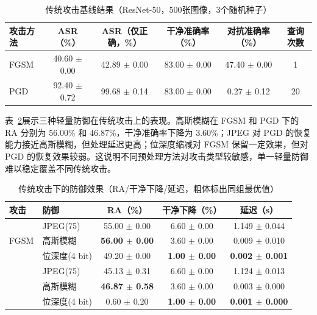 \documentclass[type=bachelor,oneside]{fduthesis}
\newcommand{\best}[1]{\textbf{#1}}
\newcommand{\tablefont}{\small}
\begin{document}
\begin{table}[htbp]
  \centering
  \caption{传统攻击基线结果（ResNet-50，500张图像，3个随机种子）}
  \label{tab:trad_attack_new}
  \tablefont
  \setlength{\tabcolsep}{3pt}
  \begin{tabular}{lccccc}
    \toprule
    攻击方法 & ASR（\%） & ASR（仅正确，\%） & 干净准确率（\%） & 对抗准确率（\%） & 查询次数 \\
    \midrule
    FGSM & 40.60 $\pm$ 0.00 & 42.89 $\pm$ 0.00 & 83.00 $\pm$ 0.00 & 47.40 $\pm$ 0.00 & 1 \\
    PGD & 92.40 $\pm$ 0.72 & 99.68 $\pm$ 0.14 & 83.00 $\pm$ 0.00 & 0.27 $\pm$ 0.12 & 20 \\
    \bottomrule
  \end{tabular}
\end{table}

表~\ref{tab:trad_defense_new}展示三种轻量防御在传统攻击上的表现。高斯模糊在 FGSM 和 PGD 下的 RA 分别为 56.00\% 和 46.87\%，干净准确率下降为 3.60\%；JPEG 对 PGD 的恢复能力接近高斯模糊，但处理延迟更高；位深度缩减对 FGSM 保留一定效果，但对 PGD 的恢复效果较弱。这说明不同预处理方法对攻击类型较敏感，单一轻量防御难以稳定覆盖不同传统攻击。

\begin{table}[htbp]
  \centering
  \caption{传统攻击下的防御效果（RA/干净下降/延迟，粗体标出同组最优值）}
  \label{tab:trad_defense_new}
  \tablefont
  \setlength{\tabcolsep}{4pt}
  \renewcommand{\arraystretch}{1.12}
  \begin{tabular}{@{}llccc@{}}
    \toprule
    攻击 & 防御 & RA（\%） & 干净下降（\%） & 延迟（s） \\
    \midrule
    \multirow{3}{*}{FGSM}
      & JPEG(75) & 55.00 $\pm$ 0.00 & 6.60 $\pm$ 0.00 & 1.149 $\pm$ 0.044 \\
      & 高斯模糊 & \best{56.00 $\pm$ 0.00} & 3.60 $\pm$ 0.00 & 0.009 $\pm$ 0.010 \\
      & 位深度(4 bit) & 49.20 $\pm$ 0.00 & \best{1.00 $\pm$ 0.00} & \best{0.002 $\pm$ 0.001} \\
    \addlinespace[2pt]
    \multirow{3}{*}{PGD}
      & JPEG(75) & 45.13 $\pm$ 0.31 & 6.60 $\pm$ 0.00 & 1.124 $\pm$ 0.013 \\
      & 高斯模糊 & \best{46.87 $\pm$ 0.58} & 3.60 $\pm$ 0.00 & 0.003 $\pm$ 0.000 \\
      & 位深度(4 bit) & 0.60 $\pm$ 0.20 & \best{1.00 $\pm$ 0.00} & \best{0.001 $\pm$ 0.000} \\
    \bottomrule
  \end{tabular}
\end{table}
\end{document}
